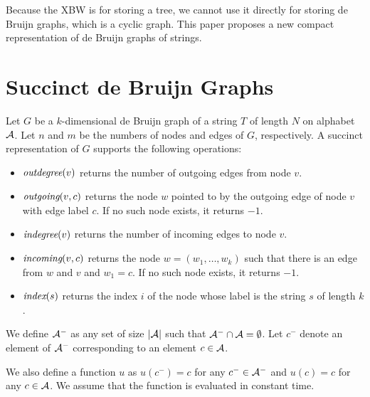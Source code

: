 Because the XBW is for storing a tree, we cannot use it directly for storing de Bruijn graphs,
which is a cyclic graph.
This paper proposes a new compact representation of de Bruijn graphs of strings.



\section{Succinct de Bruijn Graphs}\label{p1-sec:sdg}

Let $G$ be a $k$-dimensional de Bruijn graph of a string $T$ of length $N$ on alphabet ${\cal A}$.
Let $n$ and $m$ be the numbers of nodes and edges of $G$, respectively.
A succinct representation of $G$ supports the following operations:
\begin{itemize}
\item ${\textit{outdegree}}(v)$ returns the number of outgoing edges from node $v$.
\item ${\textit{outgoing}}(v, c)$ returns the node $w$ pointed to by the outgoing edge of node $v$
with edge label $c$.  If no such node exists, it returns $-1$.
\item ${\textit{indegree}}(v)$ returns the number of incoming edges to node $v$.
\item ${\textit{incoming}}(v, c)$ returns the node $w = (w_1,\ldots,w_k)$ such that 
there is an edge from $w$ and $v$
and $w_1 = c$.  If no such node exists, it returns $-1$.
\item ${\textit{index}}(s)$ returns the index $i$ of the node whose label is the string $s$ of length $k$.

\end{itemize}

We define ${\cal A}^-$ as any set of size $|{\cal A}|$ such that ${\cal A}^- \cap {\cal A} = \emptyset$. Let $c^-$ denote an element of ${\cal A}^-$ corresponding to an element $c \in {\cal A}$. 

We also define a function $u$ as $u(c^-) = c$ for any $c^- \in {\cal A}^-$ and $u(c) = c$ for any $c \in {\cal A}$.  We assume that the function is evaluated in constant time.

